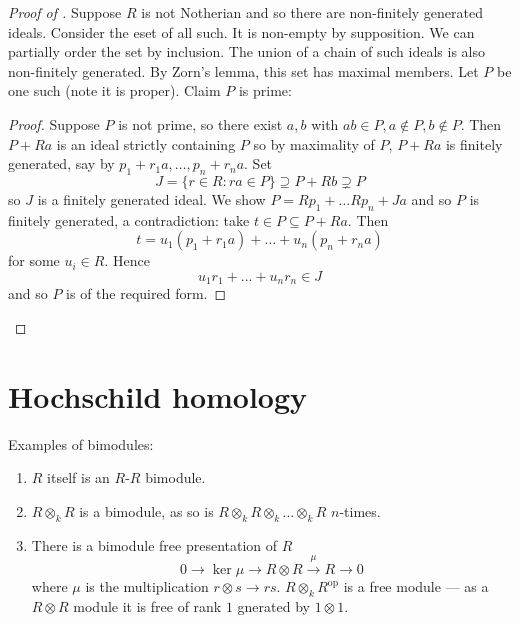 \documentclass[a4paper]{article}
\begin{document}
\begin{proof}[Proof of ]
  Suppose \(R\) is not Notherian and so there are non-finitely generated ideals. Consider the eset of all such. It is non-empty by supposition. We can partially order the set by inclusion. The union of a chain of such ideals is also non-finitely generated. By Zorn's lemma, this set has maximal members. Let \(P\) be one such (note it is proper). Claim \(P\) is prime:

  \begin{proof}
    Suppose \(P\) is not prime, so there exist \(a, b\) with \(ab \in P, a \notin P, b \notin P\). Then \(P + Ra\) is an ideal strictly containing \(P\) so by maximality of \(P\), \(P + Ra\) is finitely generated, say by \(p_1 + r_1 a, \dots , p_n + r_n a\). Set
    \[
      J = \{r \in R: ra \in P\} \supseteq P + Rb \supsetneq P
    \]
    so \(J\) is a finitely generated ideal. We show \(P = Rp_1 + \dots Rp_n + Ja\) and so \(P\) is finitely generated, a contradiction: take \(t \in P \subseteq P + Ra\). Then
    \[
      t = u_1(p_1 + r_1a) + \dots + u_n(p_n + r_na)
    \]
    for some \(u_i \in R\). Hence
    \[
      u_1r_1 + \dots + u_nr_n \in J
    \]
    and so \(P\) is of the required form.
  \end{proof}
\end{proof}











\iffalse
\section{Hochschild homology}

\begin{eg}
  Examples of bimodules:
  \begin{enumerate}
  \item \(R\) itself is an \(R\)-\(R\) bimodule.
  \item \(R \otimes_k R\) is a bimodule, as so is \(R \otimes_k R \otimes_k \dots \otimes_k R\) \(n\)-times.
  \item There is a bimodule free presentation of \(R\)
    \[
      0 \to \ker \mu \to R \otimes R \xrightarrow{\mu} R \to 0
    \]
    where \(\mu\) is the multiplication \(r \otimes s \to rs\). \(R \otimes_k R^{\text{op}}\) is a free module --- as a \(R \otimes R\) module it is free of rank \(1\) gnerated by \(1 \otimes 1\).
  \end{enumerate}
\end{eg}
\end{document}
